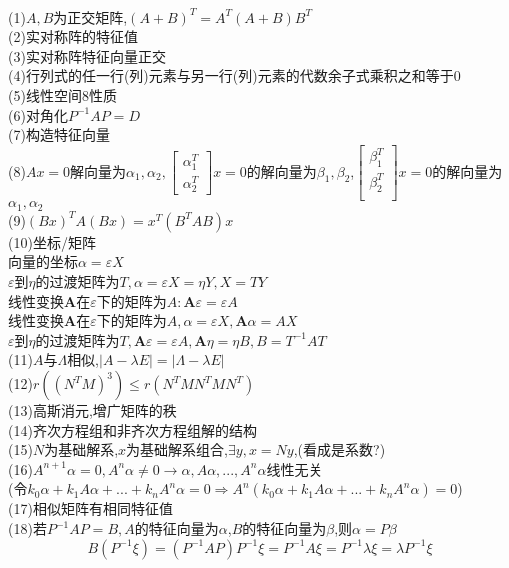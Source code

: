 \documentclass[11pt, a4paper, UTF8]{ctexart}
\begin{document}
\indent\\
\large
\raggedright
\def\fuck{\maltese}
\def\shit#1{#1\protect\hyperlink{catalog}{$\fuck$}}
\hypertarget{catalog}{}
\tableofcontents
\setcounter{secnumdepth}{-1}
(1)$A,B$为正交矩阵,$(A+B)^T=A^T(A+B)B^T$\\
(2)实对称阵的特征值\\
(3)实对称阵特征向量正交\\
(4)行列式的任一行(列)元素与另一行(列)元素的代数余子式乘积之和等于0\\
(5)线性空间8性质\\
(6)对角化$P^{-1}AP=D$\\
(7)构造特征向量\\
(8)$Ax=0$解向量为$\alpha_1,\alpha_2,\begin{bmatrix}
\alpha_1^T\\
\alpha_2^T
\end{bmatrix}x=0$的解向量为$\beta_1,\beta_2$,$\begin{bmatrix}
\beta_1^T\\
\beta_2^T\\
\end{bmatrix}x=0$的解向量为$\alpha_1,\alpha_2$\\
(9)$(Bx)^TA(Bx)=x^T(B^TAB)x$\\
(10)坐标/矩阵\\
向量的坐标$\alpha=\varepsilon X$\\
$\varepsilon$到$\eta$的过渡矩阵为$T,\alpha=\varepsilon X=\eta Y,X=TY$\\
线性变换$\bm A$在$\varepsilon$下的矩阵为$A:\bm A\varepsilon=\varepsilon A$\\
线性变换$\bm A$在$\varepsilon$下的矩阵为$A,\alpha=\varepsilon X,\bm A\alpha=AX$\\
$\varepsilon$到$\eta$的过渡矩阵为$T,\bm A\varepsilon=\varepsilon A,\bm A\eta=\eta B,B=T^{-1}AT$\\
(11)$A$与$\varLambda$相似,$|A-\lambda E|=|\varLambda-\lambda E|$\\
(12)$r((N^TM)^3)\le r(N^TMN^TMN^T)$\\
(13)高斯消元,增广矩阵的秩\\
(14)齐次方程组和非齐次方程组解的结构\\
(15)$N$为基础解系,$x$为基础解系组合,$\exists y,x=Ny$,(看成是系数?)\\
(16)$A^{n+1}\alpha=0,A^n\alpha\not=0\to\alpha,A\alpha,...,A^n\alpha$线性无关\\
(令$k_0\alpha+k_1A\alpha+...+k_nA^n\alpha=0\Rightarrow A^n(k_0\alpha+k_1A\alpha+...+k_nA^n\alpha)=0$)\\
(17)相似矩阵有相同特征值\\
(18)若$P^{-1}AP=B,A$的特征向量为$\alpha$,$B$的特征向量为$\beta$,则$\alpha=P\beta$
\[B(P^{-1}\xi)=(P^{-1}AP)P^{-1}\xi=P^{-1}A\xi=P^{-1}\lambda\xi=\lambda P^{-1}\xi\]
\end{document}
